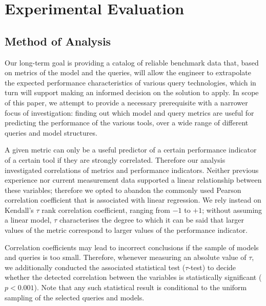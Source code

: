 \section{Experimental Evaluation}
\label{sec:eval}
% 



\subsection{Method of Analysis}
Our long-term goal is providing a catalog of reliable benchmark data that,
based on metrics of the model and the queries, will allow the engineer to
extrapolate the expected performance characteristics of various query
technologies, which in turn will support making an informed decision on the
solution to apply. In scope of this paper, we attempt to provide a necessary
prerequisite with a narrower focus of investigation: finding out which model and
query metrics are useful for predicting the performance 
of the various tools, over a wide range of different queries and model
structures.

A given metric can only be a useful predictor of a certain performance indicator
of a certain tool if they are strongly correlated. Therefore our analysis
investigated correlations of metrics and performance indicators. Neither
previous experience nor current measurement data supported a linear relationship
between these variables; therefore we opted to abandon the commonly used Pearson
correlation coefficient that is associated with linear regression. We rely
instead on Kendall's $\tau$ %
 rank correlation coefficient, ranging from $-1$ to $+1$; without assuming a
 linear model, $\tau$ characterises the degree to which it can be said that
 larger values of the metric correspond to larger values of the performance
 indicator.

Correlation coefficients may lead to incorrect conclusions if the sample of
models and queries is too small. Therefore, whenever measuring an absolute value
of $\tau$, we additionally conducted the associated statistical test
($\tau$-test) to decide whether the detected correlation between the variables
is statistically significant ($p < 0.001$). Note that any such statistical result
is conditional to the uniform sampling of the selected queries and models.


